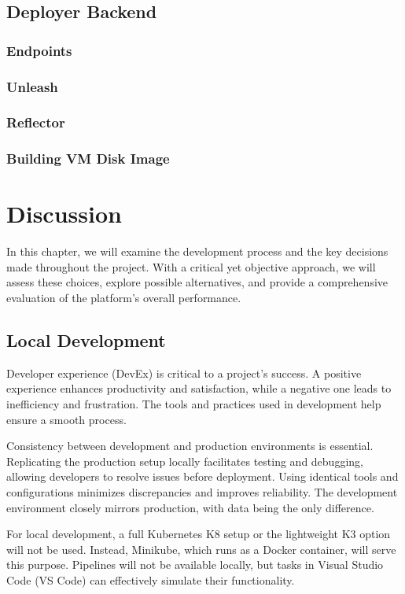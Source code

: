 \section{Deployer Backend}

\subsection{Endpoints}

\subsection{Unleash}

\subsection{Reflector}

\subsection{Building VM Disk Image}

\chapter{Discussion}
In this chapter, we will examine the development process and the key decisions made throughout the project. With a critical yet objective approach, we will assess these choices, explore possible alternatives, and provide a comprehensive evaluation of the platform's overall performance.

\section{Local Development}
Developer experience (DevEx) is critical to a project's success. A positive experience enhances productivity and satisfaction, while a negative one leads to inefficiency and frustration. The tools and practices used in development help ensure a smooth process.

Consistency between development and production environments is essential. Replicating the production setup locally facilitates testing and debugging, allowing developers to resolve issues before deployment. Using identical tools and configurations minimizes discrepancies and improves reliability. The development environment closely mirrors production, with data being the only difference.

For local development, a full Kubernetes K8 setup or the lightweight K3 option will not be used. Instead, Minikube, which runs as a Docker container, will serve this purpose. Pipelines will not be available locally, but tasks in Visual Studio Code (VS Code) can effectively simulate their functionality.

